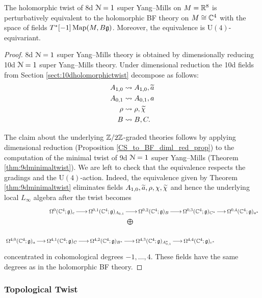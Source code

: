 \documentclass[10pt, oneside]{article}
\renewcommand{\U}{\mathrm{U}}
\begin{document}
\begin{theorem}
The holomorphic twist of 8d $\mathcal N=1$ super Yang--Mills on $M=\mathbb R^8$ is perturbatively equivalent to the holomorphic BF theory on $M\cong\mathbb C^4$ with the space of fields $T^*[-1]\operatorname{Map}(M, B\mathfrak g)$. Moreover, the equivalence is $\U(4)$-equivariant.
\label{thm:8dholomorphictwist}
\end{theorem}
\begin{proof}
8d $\mathcal N=1$ super Yang--Mills theory is obtained by dimensionally reducing 10d $\mathcal N=1$ super Yang--Mills theory. Under dimensional reduction the 10d fields from Section \ref{sect:10dholomorphictwist} decompose as follows:
\begin{align*}
A_{1, 0}&\rightsquigarrow A_{1, 0}, \widetilde{a} \\
A_{0, 1}&\rightsquigarrow A_{0, 1}, a \\
\rho&\rightsquigarrow \rho, \widetilde{\chi} \\
B&\rightsquigarrow B, C.
\end{align*}

The claim about the underlying $\mathbb Z/2\mathbb Z$-graded theories follows by applying dimensional reduction (Proposition \ref{CS_to_BF_diml_red_prop}) to the computation of the minimal twist of 9d $\mathcal N=1$ super Yang--Mills (Theorem \ref{thm:9dminimaltwist}). We are left to check that the equivalence respects  the gradings and the $\U(4)$-action. Indeed, the equivalence given by Theorem \ref{thm:9dminimaltwist} eliminates fields $A_{1, 0}, \widetilde{a}, \rho, \chi, \widetilde{\chi}$ and hence the underlying local $L_\infty$ algebra after the twist becomes
\[
\xymatrix@R=0.5cm@C=0.5cm{
&\Omega^0(\CC^4; \gg)_c \ar[r] &\Omega^{0,1}(\CC^4; \gg)_{A_{0,1}} \ar[r] &\Omega^{0,2}(\CC^4; \gg)_{B} \ar[r] &\Omega^{0,3}(\CC^4; \gg)_{C^*} \ar[r] &\Omega^{0,4}(\CC^4; \gg)_{a^*} \\
&&\ar@{}^{\bigoplus}[r] &&& \\
\Omega^{4,0}(\CC^4; \gg)_{a} \ar[r] &\Omega^{4,1}(\CC^4; \gg)_C \ar[r] &\Omega^{4,2}(\CC^4; \gg)_{B^*} \ar[r] &\Omega^{4,3}(\CC^4; \gg)_{A_{0,1}^*} \ar[r] &\Omega^{4,4}(\CC^4; \gg)_{c^*}&
}
\]
concentrated in cohomological degrees $-1, \dots, 4$. These fields have the same degrees as in the holomorphic BF theory.
\end{proof}

\subsubsection{Topological Twist}
\label{sect:8dtopologicaltwist}
\end{document}
